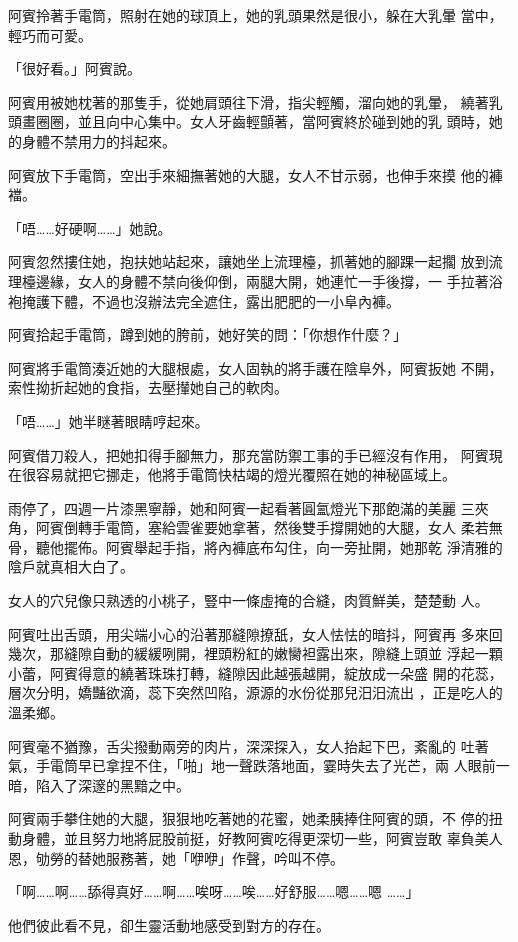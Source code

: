阿賓拎著手電筒，照射在她的球頂上，她的乳頭果然是很小，躲在大乳暈
當中，輕巧而可愛。

「很好看。」阿賓說。

阿賓用被她枕著的那隻手，從她肩頭往下滑，指尖輕觸，溜向她的乳暈，
繞著乳頭畫圈圈，並且向中心集中。女人牙齒輕顫著，當阿賓終於碰到她的乳
頭時，她的身體不禁用力的抖起來。

阿賓放下手電筒，空出手來細撫著她的大腿，女人不甘示弱，也伸手來摸
他的褲襠。

「唔……好硬啊……」她說。

阿賓忽然摟住她，抱扶她站起來，讓她坐上流理檯，抓著她的腳踝一起擱
放到流理檯邊緣，女人的身體不禁向後仰倒，兩腿大開，她連忙一手後撐，一
手拉著浴袍掩護下體，不過也沒辦法完全遮住，露出肥肥的一小阜內褲。

阿賓拾起手電筒，蹲到她的胯前，她好笑的問：「你想作什麼？」

阿賓將手電筒湊近她的大腿根處，女人固執的將手護在陰阜外，阿賓扳她
不開，索性拗折起她的食指，去壓攆她自己的軟肉。

「唔……」她半瞇著眼睛哼起來。

阿賓借刀殺人，把她扣得手腳無力，那充當防禦工事的手已經沒有作用，
阿賓現在很容易就把它挪走，他將手電筒快枯竭的燈光覆照在她的神秘區域上。

雨停了，四週一片漆黑寧靜，她和阿賓一起看著圓氳燈光下那飽滿的美麗
三夾角，阿賓倒轉手電筒，塞給雲雀要她拿著，然後雙手撐開她的大腿，女人
柔若無骨，聽他擺佈。阿賓舉起手指，將內褲底布勾住，向一旁扯開，她那乾
淨清雅的陰戶就真相大白了。

女人的穴兒像只熟透的小桃子，豎中一條虛掩的合縫，肉質鮮美，楚楚動
人。

阿賓吐出舌頭，用尖端小心的沿著那縫隙撩舐，女人怯怯的暗抖，阿賓再
多來回幾次，那縫隙自動的緩緩咧開，裡頭粉紅的嫩臠袒露出來，隙縫上頭並
浮起一顆小蕾，阿賓得意的繞著珠珠打轉，縫隙因此越張越開，綻放成一朵盛
開的花蕊，層次分明，嬌豔欲滴，蕊下突然凹陷，源源的水份從那兒汨汨流出
，正是吃人的溫柔鄉。

阿賓毫不猶豫，舌尖撥動兩旁的肉片，深深探入，女人抬起下巴，紊亂的
吐著氣，手電筒早已拿捏不住，「啪」地一聲跌落地面，霎時失去了光芒，兩
人眼前一暗，陷入了深邃的黑黯之中。

阿賓兩手攀住她的大腿，狠狠地吃著她的花蜜，她柔胰捧住阿賓的頭，不
停的扭動身體，並且努力地將屁股前挺，好教阿賓吃得更深切一些，阿賓豈敢
辜負美人恩，劬勞的替她服務著，她「咿咿」作聲，吟叫不停。

「啊……啊……舔得真好……啊……唉呀……唉……好舒服……嗯……嗯
……」

他們彼此看不見，卻生靈活動地感受到對方的存在。

